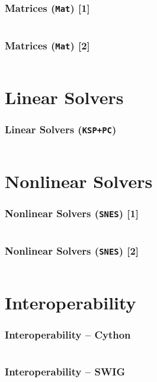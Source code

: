 \documentclass{beamer}
\begin{document}
\begin{frame}
  \frametitle{Matrices (\texttt{Mat}) [1]}
  \small\inputminted[linenos]{python}{petsc4py_mat_1.py}
\end{frame}

\begin{frame}
  \frametitle{Matrices (\texttt{Mat}) [2]}
  \small\inputminted[linenos]{python}{petsc4py_mat_2.py}
\end{frame}


\section{Linear Solvers}

\begin{frame}
  \frametitle{Linear Solvers (\texttt{KSP+PC})}
  \small\inputminted[linenos,firstline=3]{python}{petsc4py_ksp.py}
\end{frame}


\section{Nonlinear Solvers}

\begin{frame}
  \frametitle{Nonlinear Solvers (\texttt{SNES}) [1]}
  \scriptsize\inputminted[linenos]{python}{petsc4py_snes_1.py}
\end{frame}

\begin{frame}
  \frametitle{Nonlinear Solvers (\texttt{SNES}) [2]}
  \small\inputminted[linenos]{python}{petsc4py_snes_2.py}
\end{frame}


\section{Interoperability}

\begin{frame}
  \frametitle{Interoperability -- \textbf{Cython}}
  \scriptsize
  \inputminted[linenos]{cython}{wrap_cython.pyx}
\end{frame}

\begin{frame}
  \frametitle{Interoperability -- \textbf{SWIG}}
  \small
  \inputminted[linenos]{c}{wrap_swig.i}
\end{frame}
\end{document}
